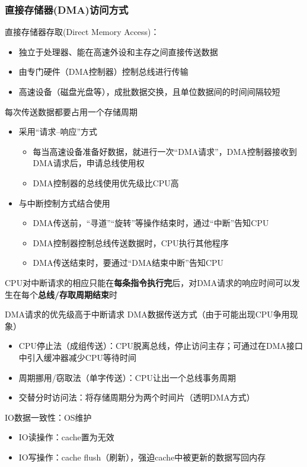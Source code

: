 \subsubsection{直接存储器(DMA)访问方式}
直接存储器存取(Direct Memory Access)：
\begin{itemize}
	\item 独立于处理器、能在高速外设和主存之间直接传送数据
	\item 由专门硬件（DMA控制器）控制总线进行传输
	\item 高速设备（磁盘光盘等），成批数据交换，且单位数据间的时间间隔较短
\end{itemize}
\par 每次传送数据都要占用一个存储周期
\begin{itemize}
\item 采用“请求--响应”方式
\begin{itemize}
	\item 每当高速设备准备好数据，就进行一次“DMA请求”，DMA控制器接收到DMA请求后，申请总线使用权
	\item DMA控制器的总线使用优先级比CPU高
\end{itemize}
\item 与中断控制方式结合使用
\begin{itemize}
	\item DMA传送前，“寻道”“旋转”等操作结束时，通过“中断”告知CPU
	\item DMA控制器控制总线传送数据时，CPU执行其他程序
	\item DMA传送结束时，要通过“DMA结束中断”告知CPU
\end{itemize}
\end{itemize}
\par CPU对中断请求的相应只能在\textbf{每条指令执行完}后，对DMA请求的响应时间可以发生在每个\textbf{总线/存取周期结束}时
\par DMA请求的优先级高于中断请求
DMA数据传送方式（由于可能出现CPU争用现象）
\begin{itemize}
	\item CPU停止法（成组传送）：CPU脱离总线，停止访问主存；可通过在DMA接口中引入缓冲器减少CPU等待时间
	\item 周期挪用/窃取法（单字传送）：CPU让出一个总线事务周期
	\item 交替分时访问法：将存储周期分为两个时间片（透明DMA方式）
\end{itemize}
IO数据一致性：OS维护
\begin{itemize}
	\item IO读操作：cache置为无效
	\item IO写操作：cache flush（刷新），强迫cache中被更新的数据写回内存
\end{itemize}

